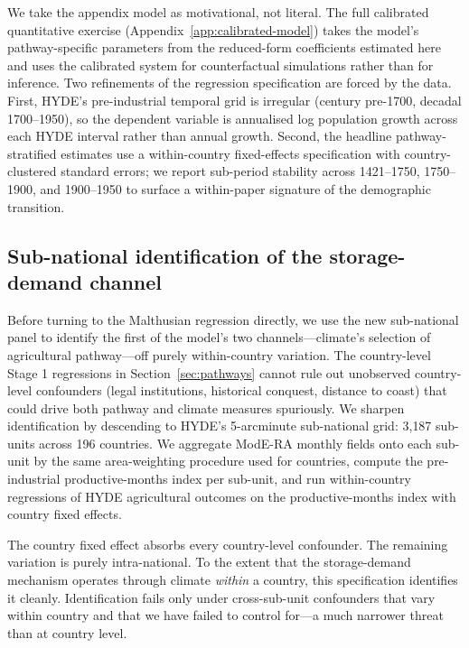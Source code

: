 \documentclass[11pt,letterpaper]{article}
\begin{document}
We take the appendix model as motivational, not literal. The full calibrated quantitative exercise (Appendix~\ref{app:calibrated-model}) takes the model's pathway-specific parameters from the reduced-form coefficients estimated here and uses the calibrated system for counterfactual simulations rather than for inference. Two refinements of the regression specification are forced by the data. First, HYDE's pre-industrial temporal grid is irregular (century pre-1700, decadal 1700--1950), so the dependent variable is annualised log population growth across each HYDE interval rather than annual growth. Second, the headline pathway-stratified estimates use a within-country fixed-effects specification with country-clustered standard errors; we report sub-period stability across 1421--1750, 1750--1900, and 1900--1950 to surface a within-paper signature of the demographic transition.

\subsection{Sub-national identification of the storage-demand channel}
\label{sec:subnational}

Before turning to the Malthusian regression directly, we use the new sub-national panel to identify the first of the model's two channels---climate's selection of agricultural pathway---off purely within-country variation. The country-level Stage 1 regressions in Section~\ref{sec:pathways} cannot rule out unobserved country-level confounders (legal institutions, historical conquest, distance to coast) that could drive both pathway and climate measures spuriously. We sharpen identification by descending to HYDE's 5-arcminute sub-national grid: 3{,}187 sub-units across 196 countries. We aggregate ModE-RA monthly fields onto each sub-unit by the same area-weighting procedure used for countries, compute the pre-industrial productive-months index per sub-unit, and run within-country regressions of HYDE agricultural outcomes on the productive-months index with country fixed effects.

The country fixed effect absorbs every country-level confounder. The remaining variation is purely intra-national. To the extent that the storage-demand mechanism operates through climate \emph{within} a country, this specification identifies it cleanly. Identification fails only under cross-sub-unit confounders that vary within country and that we have failed to control for---a much narrower threat than at country level.
\end{document}
